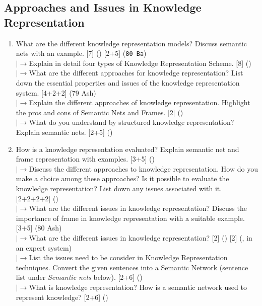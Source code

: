 \documentclass[12pt]{article}
\newcommand{\lb}{\\$\left|\rightarrow\right.$}
\begin{document}
  \subsection{Approaches and Issues in Knowledge Representation}
    \begin{enumerate}[topsep=0pt, noitemsep]
      \item What are the different knowledge representation models? Discuss semantic nets with an example. \hfill [7] () [2+5] (\texttt{80 Ba})
        \lb Explain in detail four types of Knowledge Representation Scheme. \hfill [8] ()
        \lb What are the different approaches for knowledge representation? List down the essential properties and issues of the knowledge representation system. \hfill [4+2+2] (79 Ash)
        \lb Explain the different approaches of knowledge representation. Highlight the pros and cons of Semantic Nets and Frames. \hfill [2] ()
        \lb What do you understand by structured knowledge representation? Explain semantic nets. \hfill [2+5] ()

      \item How is a knowledge representation evaluated? Explain semantic net and frame representation with examples. \hfill [3+5] ()
        \lb Discuss the different approaches to knowledge representation. How do you make a choice among these approaches? Is it possible to evaluate the knowledge representation? List down any issues associated with it. \hfill [2+2+2+2] ()
        \lb What are the different issues in knowledge representation? Discuss the importance of frame in knowledge representation with a suitable example. \hfill [3+5] (80 Ash)
        \lb What are the different issues in knowledge representation? \hfill [2] () [2] (, in an expert system)
        \lb List the issues need to be consider in Knowledge Representation techniques. Convert the given sentences into a Semantic Network (sentence list under \textit{Semantic nets} below). \hfill [2+6] ()
        \lb What is knowledge representation? How is a semantic network used to represent knowledge? \hfill [2+6] ()
    \end{enumerate}
\end{document}
